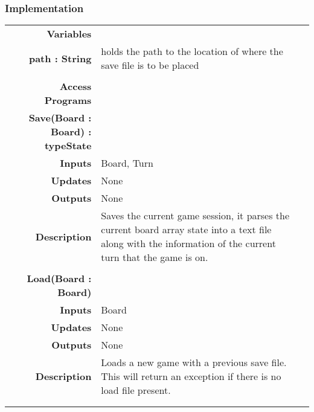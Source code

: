 \documentclass[10pt]{article}
\begin{document}
    \subsubsection{Implementation}
        \begin{tabularx}{\linewidth}{ >{\bfseries}r Xp{5cm} }
            Variables       & \begin{tabular}[t]{@{} l p{8cm}} 
                                     & \\
                                    path : String & holds the path to the location of where the save file is to be placed \\
                              \end{tabular} \\

            Access Programs & \begin{tabular}[t]{@{} l l p{8cm}} 
                                     & \\
                                    \bf{Save(Board : Board)} : typeState & \\
                                    Inputs &  Board, Turn \\
                                    Updates & None \\
                                    Outputs & None \\
                                    Description & Saves the current game session, it parses the current board array state into a text file along with the information of the current turn that the game is on. \\
                                     & \\
                                    \bf{Load(Board : Board)} & \\
                                    Inputs & Board \\
                                    Updates & None \\ 
                                    Outputs & None \\
                                    Description & Loads a new game with a previous save file. This will return an exception if there is no load file present.\\
                                     & \\
                              \end{tabular} \\
               
                                          
        \end{tabularx}
        
\end{document}
